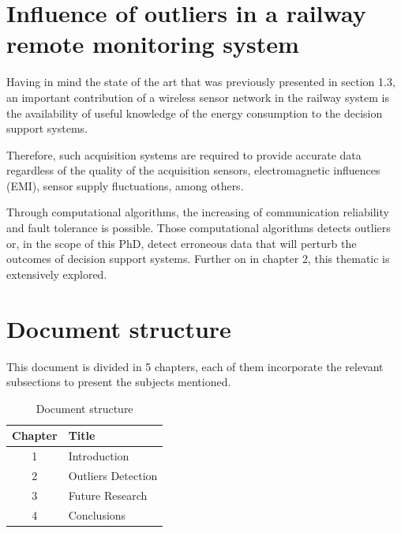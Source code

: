 \section{Influence of outliers in a railway remote monitoring system}

Having in mind the state of the art that was previously presented in section 1.3, an important contribution of a wireless sensor network in the railway system is the availability of useful knowledge of the energy consumption to the decision support systems.

Therefore, such acquisition systems are required to provide accurate data regardless of the quality of the acquisition sensors, electromagnetic influences (EMI), sensor supply fluctuations, among others.

Through computational algorithms, the increasing of communication reliability and fault tolerance is possible. Those computational algorithms detects outliers or, in the scope of this PhD, detect erroneous data that will perturb the outcomes of decision support systems. Further on in chapter 2, this thematic is extensively explored.

\section{Document structure}

This document is divided in 5 chapters, each of them incorporate the relevant subsections to present the subjects mentioned. 

\begin{table}[!h]
    \label{tb:struct}
    \centering
    \caption{Document structure}
    \vspace{0.2em}
    \begin{tabular}{c|l}%
    \textbf{Chapter} & \textbf{Title}                    \\ \hline
    1       &                   Introduction             \\ \hline
    2       &                   Outliers Detection    \\ \hline
    3       &                   Future Research    \\ \hline
    4       &                   Conclusions               \\
    \end{tabular}
\end{table}